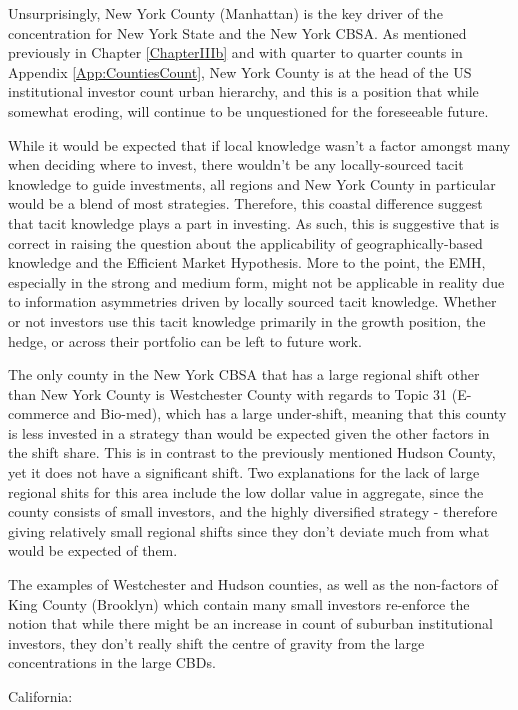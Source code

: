 Unsurprisingly, New York County (Manhattan) is the key driver of the concentration for New York State and the New York CBSA.  As mentioned previously in Chapter \ref{ChapterIIIb} and with quarter to quarter counts in Appendix \ref{App:CountiesCount}, New York County is at the head of the US institutional investor count urban hierarchy, and this is a position that while somewhat eroding, will continue to be unquestioned for the foreseeable future.  

While it would be expected that if local knowledge wasn't a factor amongst many when deciding where to invest, there wouldn't be any locally-sourced tacit knowledge to guide investments, all regions and New York County in particular would be a blend of most strategies.  Therefore, this coastal difference suggest that tacit knowledge plays a part in investing. As such, this is suggestive that \cite{Graves2003} is correct in raising the question about the applicability of geographically-based knowledge and the Efficient Market Hypothesis.  More to the point, the EMH, especially in the strong and medium form, might not be applicable in reality due to information asymmetries driven by locally sourced tacit knowledge.  Whether or not investors use this tacit knowledge primarily in the growth position, the hedge, or across their portfolio can be left to future work.  

The only county in the New York CBSA that has a large regional shift other than New York County is Westchester County with regards to Topic 31 (E-commerce and Bio-med), which has a large under-shift, meaning that this county is less invested in a strategy than would be expected given the other factors in the shift share.  This is in contrast to the previously mentioned Hudson County, yet it does not have a significant shift.  Two explanations for the lack of large regional shits for this area include the low dollar value in aggregate, since the county consists of small investors, and the highly diversified strategy - therefore giving relatively small regional shifts since they don't deviate much from what would be expected of them.  

The examples of Westchester and Hudson counties, as well as the non-factors of King County (Brooklyn) which contain many small investors re-enforce the notion that while there might be an increase in count of suburban institutional investors, they don't really shift the centre of gravity from the large concentrations in the large CBDs. 

California: 

